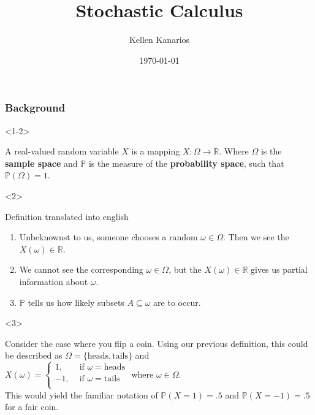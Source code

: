 \documentclass[10pt]{beamer}
\title{Stochastic Calculus}
\author{Kellen Kanarios}
\institute{University of Michigan}
\date{\today}
\begin{document}
\begin{frame}
\titlepage
\end{frame}

\begin{frame}[t]
  \frametitle{Background}
  \begin{onlyenv}<1-2>
    \begin{definition}
      A real-valued random variable $X$ is a mapping $X : \Omega \to \mathbb{R}$. Where $\Omega$ is the \textbf{sample space} and $\mathbb{P}$ is the measure of the \textbf{probability space}, such that $\mathbb{P}(\Omega) = 1$.
    \end{definition}
  \end{onlyenv}
  \begin{onlyenv}<2>
    \begin{block}{Definition translated into english}
      \begin{enumerate}
        \item 
          Unbeknownst to us, someone chooses a random $\omega \in \Omega$. Then we see the $X(\omega) \in \mathbb{R}$.
        \item 
          We cannot see the corresponding $\omega \in \Omega$, but the $X(\omega) \in \mathbb{R}$ gives us partial information about $\omega$.
        \item $\mathbb{P}$ tells us how likely subsets $A \subseteq \omega$ are to occur.
      \end{enumerate}
    \end{block}
  \end{onlyenv}
  \begin{onlyenv}<3>
    \begin{example}
      Consider the case where you flip a coin. Using our previous definition, this could be described as $\Omega = \{\text{heads}, \text{tails}\}$ and \\
      \vskip 5pt
      $X(\omega) = \begin{cases}
        1, &\text{ if }\omega = \text{heads}\\
        -1, &\text{ if }\omega = \text{tails}\\
      \end{cases}$ where $\omega \in \Omega$. \\
      \vskip 5pt
      This would yield the familiar notation of $\mathbb{P}(X = 1) = .5$ and $\mathbb{P}(X = -1) = .5$ for a fair coin.
    \end{example} 
    \end{onlyenv}

\end{frame}
\end{document}
